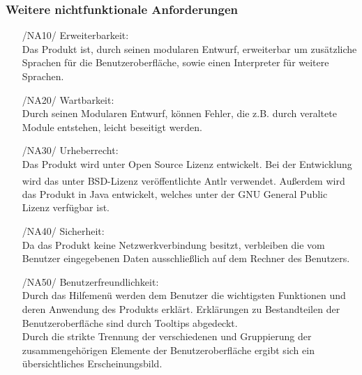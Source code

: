 \documentclass[parskip=full]{scrartcl}
\begin{document}
		\subsubsection{Weitere nichtfunktionale Anforderungen}
		\begin{itemize}
		\item[/NA10/]Erweiterbarkeit: \\
		Das Produkt ist, durch seinen modularen Entwurf, erweiterbar um zusätzliche Sprachen für die Benutzeroberfläche, sowie einen Interpreter für weitere Sprachen.
		\item[/NA20/]Wartbarkeit: \\
		Durch seinen Modularen Entwurf, können Fehler, die z.B. durch veraltete Module entstehen, leicht beseitigt werden.
		\item[/NA30/]Urheberrecht: \\
		Das Produkt wird unter Open Source Lizenz entwickelt. Bei der Entwicklung wird das unter BSD-Lizenz veröffentlichte Antlr\textsuperscript{\textcopyright} verwendet.
		Außerdem wird das Produkt in Java entwickelt, welches unter der GNU General Public Lizenz verfügbar ist.
		\item[/NA40/] Sicherheit: \\
		Da das Produkt keine Netzwerkverbindung besitzt, verbleiben die vom Benutzer eingegebenen Daten ausschließlich auf dem Rechner des Benutzers.
		\item[/NA50/]Benutzerfreundlichkeit: \\
		Durch das Hilfemenü werden dem Benutzer die wichtigsten Funktionen und deren Anwendung des Produkts erklärt. Erklärungen zu Bestandteilen der Benutzeroberfläche sind durch Tooltips abgedeckt. \\
		Durch die strikte Trennung der verschiedenen und Gruppierung der zusammengehörigen Elemente der Benutzeroberfläche ergibt sich ein übersichtliches Erscheinungsbild. 
		\end{itemize}
		
\end{document}
